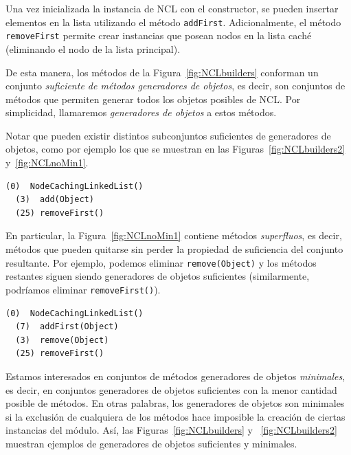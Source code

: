 Una vez inicializada la instancia de NCL con el constructor, se pueden insertar elementos en la lista utilizando el método \texttt{addFirst}. Adicionalmente, el método \texttt{removeFirst} permite crear instancias que posean nodos en la lista caché (eliminando el nodo de la lista principal). 

De esta manera, los métodos de la Figura~\ref{fig:NCLbuilders} conforman un conjunto \emph{suficiente de métodos generadores de objetos}, es decir, son conjuntos de métodos que permiten generar todos los objetos posibles de NCL. Por simplicidad, llamaremos \emph{generadores de objetos} a estos métodos.

Notar que pueden existir distintos subconjuntos suficientes de generadores de objetos, como por ejemplo los que se muestran en las Figuras~\ref{fig:NCLbuilders2} y~\ref{fig:NCLnoMin1}. 
\vspace{5pt} 
\begin{lstlisting}[numbers=none,label=fig:NCLbuilders2, caption=Otros métodos generadores de objetos, frame=tb , basicstyle=\scriptsize, xleftmargin=0pt]
  (0)  NodeCachingLinkedList()
  (3)  add(Object)
  (25) removeFirst()
\end{lstlisting}


En particular, la Figura~\ref{fig:NCLnoMin1} contiene métodos \emph{superfluos}, es decir, métodos que pueden quitarse sin perder la propiedad de suficiencia del conjunto resultante. Por ejemplo, podemos eliminar \texttt{remove(Object)} y los métodos restantes siguen siendo generadores de objetos suficientes (similarmente, podríamos eliminar \texttt{removeFirst()}). 
\vspace{5pt} 

\begin{lstlisting}[numbers=none,label=fig:NCLnoMin1, caption=Métodos generadores de objetos suficientes pero no minimales, captionpos=b, frame=tb , xleftmargin=0pt, basicstyle=\scriptsize]
  (0)  NodeCachingLinkedList()
  (7)  addFirst(Object)
  (3)  remove(Object)
  (25) removeFirst()
\end{lstlisting}

Estamos interesados en conjuntos de métodos generadores de objetos \emph{minimales}, es decir, en conjuntos generadores de objetos suficientes con la menor cantidad posible de métodos. En otras palabras, los generadores de objetos son minimales si la exclusión de cualquiera de los métodos hace imposible la creación de ciertas instancias del módulo.
Así, las Figuras~\ref{fig:NCLbuilders} y ~\ref{fig:NCLbuilders2} muestran ejemplos de generadores de objetos suficientes y minimales.

